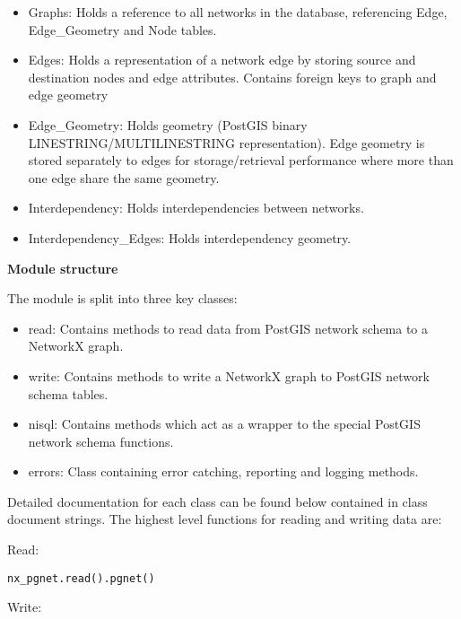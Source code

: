 \begin{itemize}
\setlength{\parskip}{0.6ex}
  \item Graphs: Holds a reference to all networks in the database, referencing 
    Edge, Edge\_Geometry and Node tables.

  \item Edges: Holds a representation of a network edge by storing source and 
    destination nodes and edge attributes. Contains foreign keys to graph 
    and edge geometry

  \item Edge\_Geometry: Holds geometry (PostGIS binary 
    LINESTRING/MULTILINESTRING representation). Edge geometry is stored 
    separately to edges for storage/retrieval performance where more than 
    one edge share the same geometry.

  \item Interdependency: Holds interdependencies between networks.

  \item Interdependency\_Edges: Holds interdependency geometry.

\end{itemize}

\textbf{Module structure    }

The module is split into three key classes:

\begin{itemize}
\setlength{\parskip}{0.6ex}
  \item read: Contains methods to read data from PostGIS network schema to a 
    NetworkX graph.

  \item write: Contains methods to write a NetworkX graph to PostGIS network 
    schema tables.

  \item nisql: Contains methods which act as a wrapper to the special PostGIS 
    network schema functions.

  \item errors: Class containing error catching, reporting and logging methods.

\end{itemize}

Detailed documentation for each class can be found below contained in class
document strings. The highest level functions for reading and writing data 
are:

Read:

\begin{alltt}
\pysrcprompt{{\textgreater}{\textgreater}{\textgreater} }nx\_pgnet.read().pgnet()
\pysrcprompt{{\textgreater}{\textgreater}{\textgreater} }\end{alltt}
Write:

